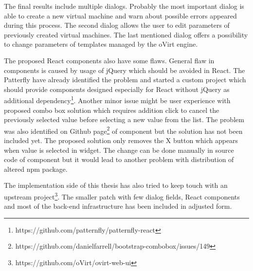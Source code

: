 The final results include multiple dialogs. Probably the most important dialog is able to create a new virtual machine and warn about possible errors appeared during this process. The second dialog allows the user to edit parameters of previously created virtual machines. The last mentioned dialog offers a possibility to change parameters of templates managed by the oVirt engine.

The proposed React components also have some flaws. General flaw in components is caused by usage of jQuery which should be avoided in React. The Patterfly have already identified the problem and started a custom project which should provide components designed especially for React without jQuery as additional dependency\footnote{https://github.com/patternfly/patternfly-react}. Another minor issue might be user experience with proposed combo box solution which requires addition click to cancel the previously selected value before selecting a new value from the list. The problem was also identified on Github page\footnote{https://github.com/danielfarrell/bootstrap-combobox/issues/149 } of component but the solution has not been included yet. The proposed solution only removes the X button which appears when value is selected in widget. The change can be done manually in source code of component but it would lead to another problem with distribution of altered npm package.

The implementation side of this thesis has also tried to keep touch with an upstream project\footnote{https://github.com/oVirt/ovirt-web-ui}. The smaller patch with few dialog fields, React components and most of the back-end infrastructure has been included in adjusted form.


 
